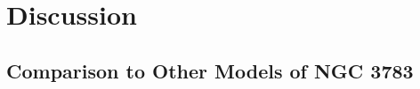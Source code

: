 \graphicspath{{figures/discussion}}
\section{Discussion}








\label{sec:discussion}

\subsection{Comparison to Other Models of NGC 3783}

